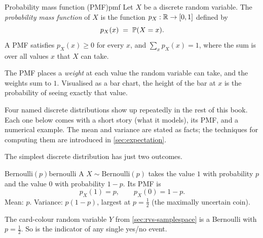 \begin{definition}{Probability mass function (PMF)}{pmf}
Let $X$ be a discrete random variable. The \emph{probability mass function} of $X$ is the function $p_X : \mathbb{R} \to [0, 1]$ defined by
\[
p_X(x) \;=\; \mathbb{P}(X = x).
\]
A PMF satisfies $p_X(x) \ge 0$ for every $x$, and $\sum_x p_X(x) = 1$, where the sum is over all values $x$ that $X$ can take.
\end{definition}

\begin{intuition}
The PMF places a \emph{weight} at each value the random variable can take, and the weights sum to $1$. Visualised as a bar chart, the height of the bar at $x$ is the probability of seeing exactly that value.
\end{intuition}

Four named discrete distributions show up repeatedly in the rest of this book. Each one below comes with a short story (what it models), its PMF, and a numerical example. The mean and variance are stated as facts; the techniques for computing them are introduced in \cref{sec:expectation}.



The simplest discrete distribution has just two outcomes.

\begin{example}{Bernoulli$(p)$}{bernoulli}
A  $X \sim \mathrm{Bernoulli}(p)$ takes the value $1$ with probability $p$ and the value $0$ with probability $1 - p$. Its PMF is
\[
p_X(1) = p, \qquad p_X(0) = 1 - p.
\]
Mean: $p$. Variance: $p(1 - p)$, largest at $p = \tfrac{1}{2}$ (the maximally uncertain coin).
\end{example}

The card-colour random variable $Y$ from \cref{sec:rvs-samplespace} is a Bernoulli with $p = \tfrac{1}{2}$. So is the indicator of any single yes/no event.



